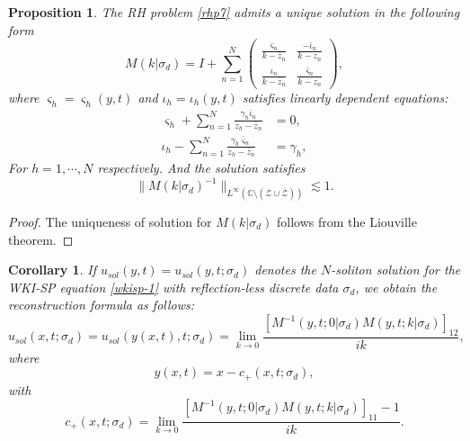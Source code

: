 \documentclass[11pt]{article}
\numberwithin{equation}{section}
\newtheorem{corollary}{Corollary}
\newtheorem{Proposition}{Proposition}
\begin{document}
\begin{Proposition}\label{p13}
    The RH problem \ref{rhp7} admits a unique solution in the following form
    \begin{equation*}
M(k|\sigma_d) = I + \sum_{n=1}^N
\begin{pmatrix}
\frac{\varsigma_n}{k - \bar{z}_n} & \frac{-\bar{\iota}_n}{k - z_n} \\
\frac{\iota_n}{k - \bar{z}_n} & \frac{\bar{\varsigma}_n}{k - z_n}
\end{pmatrix} ,
    \end{equation*}
where $\varsigma_h=\varsigma_h(y,t)$ and $\iota_h=\iota_h(y,t)$ satisfies linearly dependent equations:
\begin{align*}
\varsigma_h+\sum_{n=1}^N\frac{\gamma_h\bar{\iota}_n}{z_h-\bar{z}_n}&=0,\\
\iota_h-\sum_{n=1}^N\frac{\gamma_h\bar{\varsigma}_n}{z_h-\bar{z}_n}&=\gamma_h,
\end{align*}
For $h=1,\cdots,N$ respectively.
    And the solution satisfies
    \begin{equation*}
\|M(k|\sigma_d)^{-1}\|_{L^\infty(\mathbb{C} \setminus (\mathcal{Z} \cup \overline{\mathcal{Z}}))} \lesssim 1.
    \end{equation*}
\end{Proposition}
\begin{proof}
    The uniqueness of solution for $M(k|\sigma_d)$ follows from the Liouville theorem.
\end{proof}

\begin{corollary}\label{c2}
    If $u_{sol}(y, t) = u_{sol}(y, t; \sigma_d)$ denotes the $N$-soliton solution for the WKI-SP equation \eqref{wkisp-1} with reflection-less discrete data $\sigma_d$, we obtain the reconstruction formula as follows:
\begin{equation}
u_{sol}(x, t;\sigma_d) = u_{sol}(y(x, t), t;\sigma_d) = \lim_{k \to 0} \frac{\left[M^{-1}( y, t;0|\sigma_d) M( y, t;k|\sigma_d)\right]_{12}}{i k},
\end{equation}
where
\begin{equation}
    y(x,t)=x-c_+(x,t; \sigma_d),
\end{equation}
with
\begin{equation}
    c_+(x, t; \sigma_d)= \lim_{k \to 0} \frac{\left[M^{-1}( y, t;0|\sigma_d) M( y, t;k|\sigma_d)\right]_{11} - 1}{i k}.
\end{equation}

\end{corollary}
\end{document}
